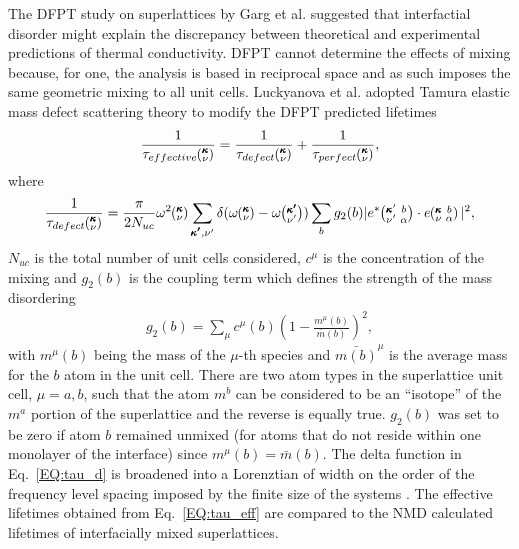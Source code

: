 \documentclass[aps,prb,preprint,preprintnumbers,amsmath,amssymb,floatfix,superscriptaddress]{revtex4}
\newcommand{\kvba}{\mspace{-4.0mu}\left(\mspace{-8.0mu}
\begin{smallmatrix} &\pmb{\kappa} &b \\ &\nu &\alpha\end{smallmatrix}
\mspace{-3.0mu}\right)}
\newcommand{\kvbap}{\mspace{-4.0mu}\left(\mspace{-8.0mu}
\begin{smallmatrix} &\pmb{\kappa}' &b \\ &\nu' &\alpha\end{smallmatrix}
\mspace{-3.0mu}\right)}
\newcommand{\kv}{\mspace{-4.0mu}\left(\mspace{-8.0mu}
\begin{smallmatrix}&\pmb{\kappa} \\&\nu\end{smallmatrix}
\mspace{-3.0mu}\right)}
\newcommand{\kvp}{\mspace{-4.0mu}\left(\mspace{-8.0mu}
\begin{smallmatrix}&\pmb{\kappa'} \\&\nu'\end{smallmatrix}
\mspace{-3.0mu}\right)}
\begin{document}
The DFPT study on superlattices by Garg et al. \cite{doi:10.1021/nl202186y} suggested that interfactial disorder might explain the discrepancy between theoretical and experimental predictions of thermal conductivity. DFPT cannot determine the effects of mixing because, for one, the analysis is based in reciprocal space and as such imposes the same geometric mixing to all unit cells. Luckyanova et al. \cite{Luckyanova16112012} adopted Tamura elastic mass defect scattering theory \cite{tamura_isotope_1983} to modify the DFPT predicted lifetimes
\begin{equation}\label{EQ:tau_eff}
\begin{split}
\frac{1}{\tau_{effective}\kv} = \frac{1}{\tau_{defect}\kv}+\frac{1}{\tau_{perfect}\kv} ,
\end{split}
\end{equation}
where
\begin{equation}\label{EQ:tau_d}
\begin{split}
\frac{1}{\tau_{defect}\kv} = \frac{\pi}{2N_{uc}}\omega^2\kv 
\sum_{\pmb{\kappa'},\nu'} \delta( \omega\kv - \omega\kvp )\sum_{b} g_2(b) 
|e^*\kvbap \cdot e\kvba |^2 ,
\end{split}
\end{equation}
$N_{uc}$ is the total number of unit cells considered, $c^\mu$ is the concentration of the mixing and $g_2(b)$ is the coupling term which defines the strength of the mass disordering
\begin{equation}\label{EQ:g(b)}
\begin{split}
g_2(b) = \sum_\mu c^{\mu}(b)\left(1-\frac{m^{\mu}(b)}{\bar{m}(b)}\right)^2, 
\end{split}
\end{equation}
with $m^\mu(b)$ being the mass of the $\mu$-th species and $\bar{m(b)}^{\mu}$ is the average mass for the $b$ atom in the unit cell. There are two atom types in the superlattice unit cell, $\mu=a,b$, such that the atom $m^b$ can be considered to be an ``isotope'' of the $m^a$ portion of the superlattice and the reverse is equally true. $g_2(b)$ was set to be zero if atom $b$ remained unmixed (for atoms that do not reside within one monolayer of the interface) since $m^{\mu}(b)=\bar{m}(b)$. The delta function in Eq.~\ref{EQ:tau_d} is broadened into a Lorenztian of width on the order of the frequency level spacing imposed by the finite size of the systems \cite{allen_thermal_1993}. The effective lifetimes obtained from Eq.~\ref{EQ:tau_eff} are compared to the NMD calculated lifetimes of interfacially mixed superlattices.
\end{document}
